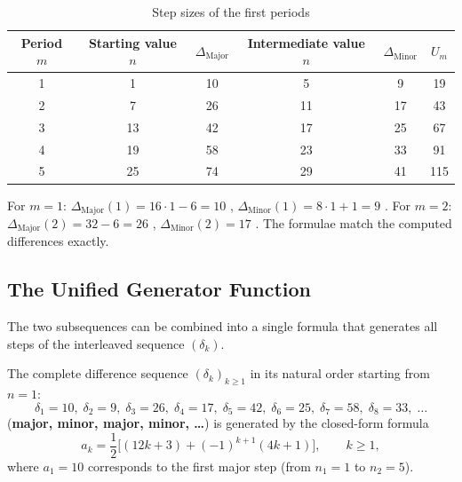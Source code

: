 \begin{table}[htbp]
\centering
\caption{Step sizes of the first periods}
\begin{tabular}{c|cc|cc|c}
\toprule
Period $m$ & Starting value $n$ & $\Delta_{\mathrm{Major}}$ &
Intermediate value $n$ & $\Delta_{\mathrm{Minor}}$ & $U_m$ \\
\midrule
1 & 1  & 10 & 5  & 9  & 19 \\
2 & 7  & 26 & 11 & 17 & 43 \\
3 & 13 & 42 & 17 & 25 & 67 \\
4 & 19 & 58 & 23 & 33 & 91 \\
5 & 25 & 74 & 29 & 41 & 115 \\
\bottomrule
\end{tabular}
\end{table}

\begin{remark}
For $m=1$: $\Delta_{\mathrm{Major}}(1) = 16\cdot1 - 6 = 10$ ,
$\Delta_{\mathrm{Minor}}(1) = 8\cdot1 + 1 = 9$ .
For $m=2$: $\Delta_{\mathrm{Major}}(2) = 32-6 = 26$ ,
$\Delta_{\mathrm{Minor}}(2) = 17$ . The formulae match
the computed differences exactly.
\end{remark}

\subsection{The Unified Generator Function}

The two subsequences can be combined into a single formula
that generates all steps of the interleaved sequence $(\delta_k)$.

\begin{theorem}
The complete difference sequence $(\delta_k)_{k \geq 1}$ in its natural
order starting from $n = 1$:
\[
  \delta_1 = 10,\; \delta_2 = 9,\; \delta_3 = 26,\; \delta_4 = 17,\;
  \delta_5 = 42,\; \delta_6 = 25,\; \delta_7 = 58,\; \delta_8 = 33,\; \ldots
\]
(\textbf{major, minor, major, minor, \ldots}) is generated by the closed-form
formula
\begin{equation}
  a_k = \frac{1}{2}\bigl[(12k+3) + (-1)^{k+1}(4k+1)\bigr],
  \qquad k \geq 1,
\end{equation}
where $a_1 = 10$ corresponds to the first major step (from $n_1 = 1$ to
$n_2 = 5$).
\end{theorem}

